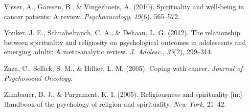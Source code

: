 \documentclass[
  english,
  man]{apa6}
\begin{document}
\leavevmode\hypertarget{ref-Visser2010-kq}{}%
Visser, A., Garssen, B., \& Vingerhoets, A. (2010). Spirituality and well-being in cancer patients: A review. \emph{Psychooncology}, \emph{19}(6), 565--572.

\leavevmode\hypertarget{ref-Yonker2012-zg}{}%
Yonker, J. E., Schnabelrauch, C. A., \& Dehaan, L. G. (2012). The relationship between spirituality and religiosity on psychological outcomes in adolescents and emerging adults: A meta-analytic review. \emph{J. Adolesc.}, \emph{35}(2), 299--314.

\leavevmode\hypertarget{ref-Zaza2005-ac}{}%
Zaza, C., Sellick, S. M., \& Hillier, L. M. (2005). Coping with cancer. \emph{Journal of Psychosocial Oncology}.

\leavevmode\hypertarget{ref-Zinnbauer2005-vz}{}%
Zinnbauer, B. J., \& Pargament, K. I. (2005). Religiousness and spirituality {[}in:{]} Handbook of the psychology of religion and spirituality. \emph{New York}, 21--42.

\endgroup
\end{document}
